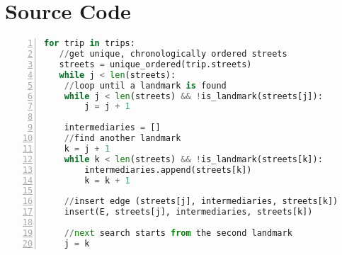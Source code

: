 \chapter{Source Code}
\begin{lstlisting}[language = Python, caption = {Pseudocode for constructing landmark graph}, label = {List:code_ldmk_graph}, frame=single, numbers=left, stepnumber=1]
for trip in trips:
   //get unique, chronologically ordered streets
   streets = unique_ordered(trip.streets)
   while j < len(streets):
	//loop until a landmark is found
	while j < len(streets) && !is_landmark(streets[j]):
		j = j + 1
		
	intermediaries = []
	//find another landmark
	k = j + 1
	while k < len(streets) && !is_landmark(streets[k]):
		intermediaries.append(streets[k])
		k = k + 1
		
	//insert edge (streets[j], intermediaries, streets[k])
	insert(E, streets[j], intermediaries, streets[k])
		
	//next search starts from the second landmark
	j = k
\end{lstlisting}

\clearpage
\newpage
